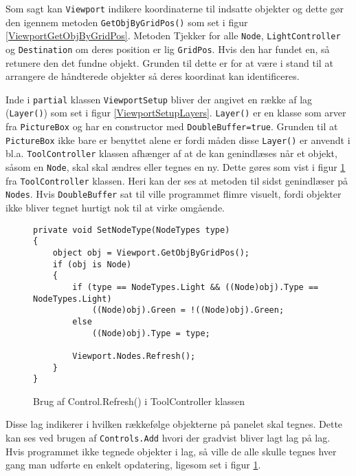 Som sagt kan \texttt{Viewport} indikere koordinaterne til indsatte objekter og dette gør den igennem metoden \texttt{GetObjByGridPos()} som set i figur \ref{ViewportGetObjByGridPos}. Metoden Tjekker for alle \texttt{Node}, \texttt{LightController} og \texttt{Destination} om deres position er lig \texttt{GridPos}. Hvis den har fundet en, så retunere den det fundne objekt. Grunden til dette er for at være i stand til at arrangere de håndterede objekter så deres koordinat kan identificeres.

\vspace{5mm}

Inde i \texttt{partial} klassen \texttt{ViewportSetup} bliver der angivet en række af lag (\texttt{Layer()}) som set i figur \ref{ViewportSetupLayers}. \texttt{Layer()} er en klasse som arver fra \texttt{PictureBox} og har en constructor med \texttt{DoubleBuffer=true}. Grunden til at \texttt{PictureBox} ikke bare er benyttet alene er fordi måden disse \texttt{Layer()} er anvendt i bl.a. \texttt{ToolController} klassen afhænger af at de kan genindlæses når et objekt, såsom en \texttt{Node}, skal skal ændres eller tegnes en ny. Dette gøres som vist i figur \ref{ToolControllerSetNodeType} fra \texttt{ToolController} klassen. Heri kan der ses at metoden til sidst genindlæser på \texttt{Nodes}. Hvis \texttt{DoubleBuffer} sat til  ville programmet flimre visuelt, fordi objekter ikke bliver tegnet hurtigt nok til at virke omgående.

\begin{figure}[H]
\begin{lstlisting}
private void SetNodeType(NodeTypes type)
{
    object obj = Viewport.GetObjByGridPos();
    if (obj is Node)
    {
        if (type == NodeTypes.Light && ((Node)obj).Type == NodeTypes.Light)
            ((Node)obj).Green = !((Node)obj).Green;
        else
            ((Node)obj).Type = type;

        Viewport.Nodes.Refresh();
    }
}
\end{lstlisting}
\caption{Brug af Control.Refresh() i ToolController klassen}
\label{ToolControllerSetNodeType}
\end{figure}

Disse lag indikerer i hvilken rækkefølge objekterne på panelet skal tegnes. Dette kan ses ved brugen af \texttt{Controls.Add} hvori der gradvist bliver lagt lag på lag. Hvis programmet ikke tegnede objekter i lag, så ville de alle skulle tegnes hver gang man udførte en enkelt opdatering, ligesom set i figur \ref{ToolControllerSetNodeType}.

